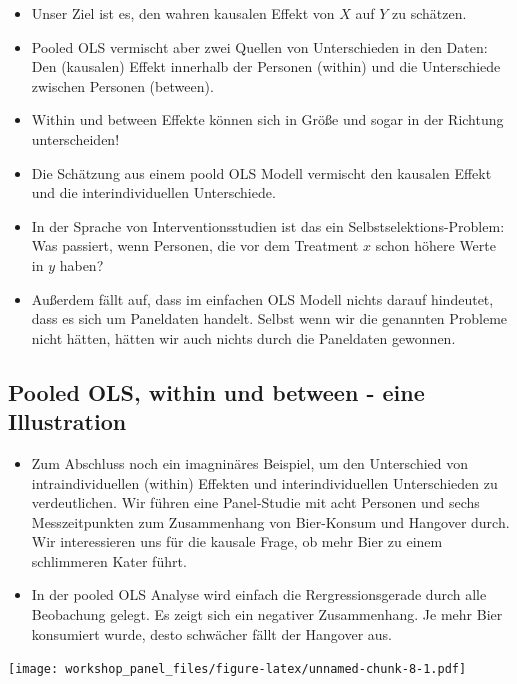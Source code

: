 \documentclass[]{book}
\providecommand{\tightlist}{%
  \setlength{\itemsep}{0pt}\setlength{\parskip}{0pt}}
\begin{document}
\begin{itemize}
\tightlist
\item
  Unser Ziel ist es, den wahren kausalen Effekt von \(X\) auf \(Y\) zu schätzen.
\item
  Pooled OLS vermischt aber zwei Quellen von Unterschieden in den Daten: Den (kausalen) Effekt innerhalb der Personen (within) und die Unterschiede zwischen Personen (between).
\item
  Within und between Effekte können sich in Größe und sogar in der Richtung unterscheiden!
\item
  Die Schätzung aus einem poold OLS Modell vermischt den kausalen Effekt und die interindividuellen Unterschiede.
\item
  In der Sprache von Interventionsstudien ist das ein Selbstselektions-Problem: Was passiert, wenn Personen, die vor dem Treatment \(x\) schon höhere Werte in \(y\) haben?
\item
  Außerdem fällt auf, dass im einfachen OLS Modell nichts darauf hindeutet, dass es sich um Paneldaten handelt. Selbst wenn wir die genannten Probleme nicht hätten, hätten wir auch nichts durch die Paneldaten gewonnen.
\end{itemize}

\hypertarget{pooled-ols-within-und-between---eine-illustration}{%
\subsection*{Pooled OLS, within und between - eine Illustration}\label{pooled-ols-within-und-between---eine-illustration}}

\begin{itemize}
\item
  Zum Abschluss noch ein imagninäres Beispiel, um den Unterschied von intraindividuellen (within) Effekten und interindividuellen Unterschieden zu verdeutlichen. Wir führen eine Panel-Studie mit acht Personen und sechs Messzeitpunkten zum Zusammenhang von Bier-Konsum und Hangover durch. Wir interessieren uns für die kausale Frage, ob mehr Bier zu einem schlimmeren Kater führt.
\item
  In der pooled OLS Analyse wird einfach die Rergressionsgerade durch alle Beobachung gelegt. Es zeigt sich ein negativer Zusammenhang. Je mehr Bier konsumiert wurde, desto schwächer fällt der Hangover aus.
\end{itemize}

\texttt{[image: workshop\_panel\_files/figure-latex/unnamed-chunk-8-1.pdf]}
\end{document}
